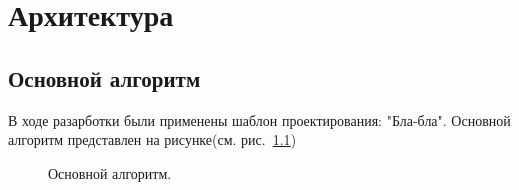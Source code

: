 
\chapter{Архитектура}

\section{Основной алгоритм}
В ходе разарботки были применены шаблон проектирования: "Бла-бла". Основной алгоритм представлен на рисунке(см. рис.~\ref{ris:alg_main})

\begin{figure}[h]
\caption{Основной алгоритм.}
\label{ris:alg_main}
\end{figure}